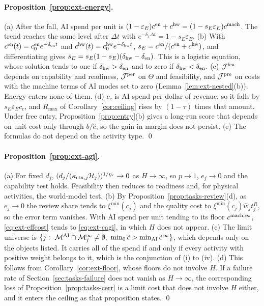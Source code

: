 \paragraph{Proposition~\ref{prop:ext-energy}.} (a) After the fall, AI spend per unit is $(1-\varepsilon_E)c^{\rm en}+c^{\rm hw}=(1-s_E\varepsilon_E)c^{\rm mach}$. The trend reaches the same level after $\Delta t$ with $e^{-\delta_\pi\Delta t}=1-s_E\varepsilon_E$. (b) With $c^{\rm en}(t)=c^{\rm en}_0e^{-\delta_{\rm en}t}$ and $c^{\rm hw}(t)=c^{\rm hw}_0e^{-\delta_{\rm hw}t}$, $s_E=c^{\rm en}/(c^{\rm en}+c^{\rm hw})$, and differentiating gives $\dot s_E=s_E(1-s_E)(\delta_{\rm hw}-\delta_{\rm en})$. This is a logistic equation, whose solution tends to one if $\delta_{\rm hw}>\delta_{\rm en}$ and to zero if $\delta_{\rm hw}<\delta_{\rm en}$. (c) $\mathcal J^{\rm fea}$ depends on capability and readiness, $\mathcal J^{\rm per}$ on $\Theta$ and feasibility, and $\mathcal J^{\rm pre}$ on costs with the machine terms of AI modes set to zero (Lemma~\ref{lem:ext-nested}(b)). Energy enters none of them. (d) $c_c$ is AI spend per dollar of revenue, so it falls by $s_E\varepsilon_Ec_c$, and $R_{\max}$ of Corollary~\ref{cor:ceiling} rises by $(1-\tau)$ times that amount. Under free entry, Proposition~\ref{prop:entry}(b) gives a long-run score that depends on unit cost only through $b/\hat c$, so the gain in margin does not persist. (e) The formulas do not depend on the activity type. \qed

\paragraph{Proposition~\ref{prop:ext-agi}.} (a) For fixed $d_j$, $(d_j/(\kappa_{{\rm ctx},j}\mathcal H_j))^{1/\eta_r}\to0$ as $H\to\infty$, so $p\to1$, $e_j\to0$ and the capability test holds. Feasibility then reduces to readiness and, for physical activities, the world-model test. (b) By Proposition~\ref{prop:tasks-review}(d), as $e_j\to0$ the review share tends to $\xi^{\min}(c_j)$ and the quality cost to $\xi^{\min}(c_j)\hat w_jt^R_j$, so the error term vanishes. With AI spend per unit tending to its floor $c^{\rm mach,\infty}$, \eqref{eq:ext-effcost} tends to \eqref{eq:ext-cagi}, in which $H$ does not appear. (c) The limit universe is $\{j:\ \mathcal M^{\rm AI}\cap\mathcal M_j^\infty\neq\emptyset,\ \min_0\tilde c>\min_{\rm AI}\tilde c^{\,\infty}\}$, which depends only on the objects listed. It carries all of the spend if and only if every activity with positive weight belongs to it, which is the conjunction of (i) to (iv). (d) This follows from Corollary~\ref{cor:ext-floor}, whose floors do not involve $H$. If a failure rate of Section~\ref{sec:tasks-failure} does not vanish as $H\to\infty$, the corresponding loss of Proposition~\ref{prop:tasks-cerr} is a limit cost that does not involve $H$ either, and it enters the ceiling as that proposition states. \qed

